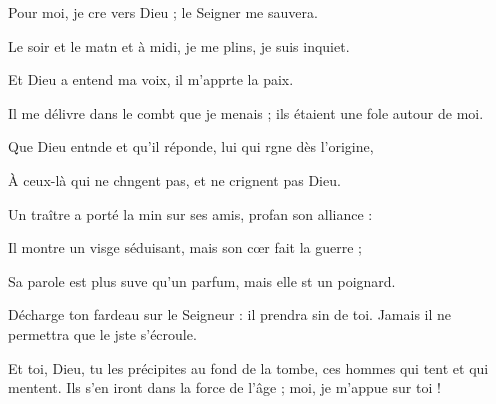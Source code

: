 \item Pour moi, je cre vers Dieu ;\psstar{} le Seigner me sauvera.
\item Le soir et le matn et à midi,\psstar{} je me plins, je suis inquiet.
\item Et Dieu a entend ma voix,\psstar{} il m’apprte la paix.
\item Il me délivre dans le combt que je menais ;\psstar{} ils étaient une fole autour de moi.
\item Que Dieu entnde et qu’il réponde,\psstar{} lui qui rgne dès l’origine,
\item À ceux-là qui ne chngent pas,\psstar{} et ne crignent pas Dieu.
\item Un traître a porté la min sur ses amis,\psstar{} profan son alliance :
\item Il montre un visge séduisant,\psstar{} mais son cœr fait la guerre ; 
\item Sa parole est plus suve qu’un parfum,\psstar{} mais elle st un poignard.
\item Décharge ton fardeau sur le Seigneur : il prendra sin de toi.\psstar{} Jamais il ne permettra que le jste s’écroule.
\item Et toi, Dieu, tu les précipites au fond de la tombe,\pscross{} ces hommes qui tent et qui mentent.\psstar{} Ils s’en iront dans la force de l’âge ; moi, je m’appue sur toi !